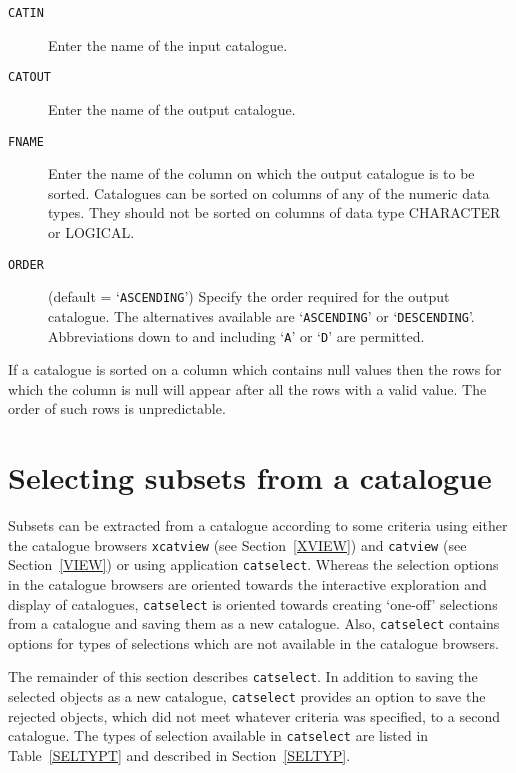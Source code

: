 \documentclass[twoside,11pt]{article}
\newcommand{\xlabel}[1]{}
\renewcommand{\_}{\texttt{\symbol{95}}}
\begin{document}
\begin{description}

  \item[ {\tt CATIN} ] Enter the name of the input catalogue.

  \item[ {\tt CATOUT} ] Enter the name of the output catalogue.

  \item[ {\tt FNAME} ] Enter the name of the column on which the output
   catalogue is to be sorted.  Catalogues can be sorted on columns of any
   of the numeric data types.  They should not be sorted on columns of
   data type CHARACTER or LOGICAL.

  \item[ {\tt ORDER} ] (default = `{\tt ASCENDING}') Specify the order
   required for the output    catalogue.  The alternatives available are
   `{\tt ASCENDING}' or `{\tt DESCENDING}'.  Abbreviations down to and
   including `{\tt A}' or `{\tt D}' are permitted.

\end{description}

If a catalogue is sorted on a column which contains null values then the
rows for which the column is null will appear after all the rows with a
valid value. The order of such rows is unpredictable.



\section{\xlabel{SELECT}\label{SELECT}Selecting subsets from a catalogue}

Subsets can be extracted from a catalogue according to some criteria
using either the catalogue browsers {\tt xcatview} (see
Section~\ref{XVIEW}) and {\tt catview} (see Section~\ref{VIEW}) or using
application {\tt catselect}.  Whereas the selection options in the
catalogue browsers are oriented towards the interactive exploration
and display of catalogues, {\tt catselect} is oriented towards creating
`one-off' selections from a catalogue and saving them as a new
catalogue.  Also, {\tt catselect} contains options for types of
selections which are not available in the catalogue browsers.

The remainder of this section describes {\tt catselect}.  In addition to
saving the selected objects as a new catalogue, {\tt catselect}
provides an option to save the rejected objects, which did not meet
whatever criteria was specified, to a second catalogue.  The types of
selection available in {\tt catselect} are listed in Table~\ref{SELTYPT}
and described in Section~\ref{SELTYP}.
\end{document}
